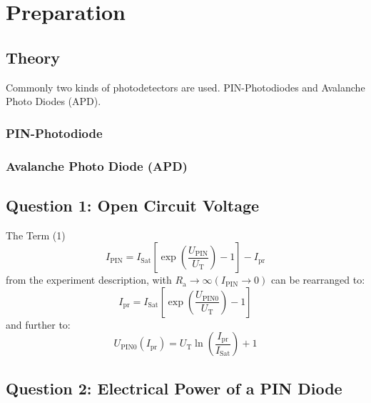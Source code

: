 \chapter{Preparation}

\section{Theory}
Commonly two kinds of photodetectors are used. PIN-Photodiodes and Avalanche Photo Diodes (APD).
\subsection{PIN-Photodiode}

\subsection{Avalanche Photo Diode (APD)}
\section{Question 1: Open Circuit Voltage}
The Term (1)
\begin{equation}
 I_{\mathrm{PIN}} = I_{\mathrm{Sat}}\left[\exp\left(\frac{U_{\mathrm{PIN}}}{U_{\mathrm{T}}}\right)-1\right] -I_{\mathrm{pr}}
\label{eq:diode}
\end{equation}
from the experiment description, with $R_{\mathrm{a}}\to\infty(I_{\mathrm{PIN}}\to0)$ can be rearranged to:
\begin{equation}
 I_{\mathrm{pr}} = I_{\mathrm{Sat}}\left[\exp\left(\frac{U_{\mathrm{PIN0}}}{U_{\mathrm{T}}}\right)-1\right]
\end{equation}
and further to:
\begin{equation}
 U_{\mathrm{PIN0}}(I_{\mathrm{pr}}) = U_{\mathrm{T}}\ln\left(\frac{I_{\mathrm{pr}}}{I_{\mathrm{Sat}}}\right)+1
\end{equation}

\section{Question 2: Electrical Power of a PIN Diode}

